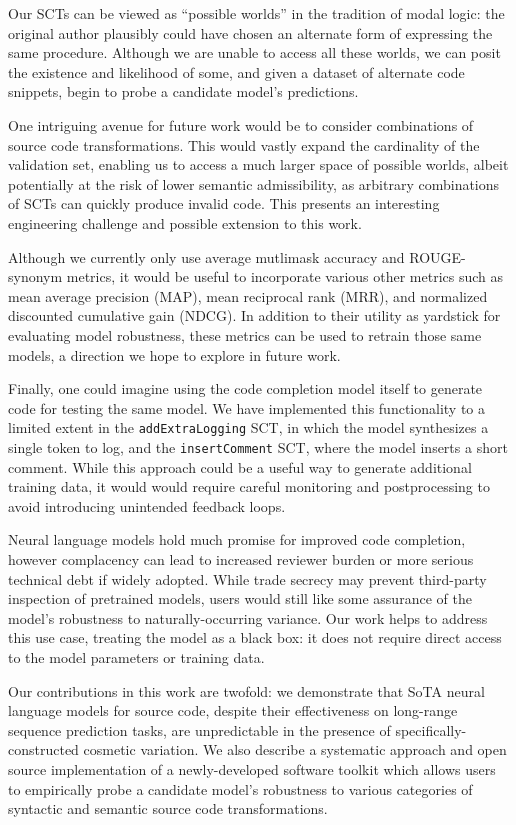 \documentclass[usenames,dvipsnames]{article} %
\begin{document}
  Our SCTs can be viewed as ``possible worlds'' in the tradition of modal logic: the original author plausibly could have chosen an alternate form of expressing the same procedure. Although we are unable to access all these worlds, we can posit the existence and likelihood of some, and given a dataset of alternate code snippets, begin to probe a candidate model's predictions.

  One intriguing avenue for future work would be to consider combinations of source code transformations. This would vastly expand the cardinality of the validation set, enabling us to access a much larger space of possible worlds, albeit potentially at the risk of lower semantic admissibility, as arbitrary combinations of SCTs can quickly produce invalid code. This presents an interesting engineering challenge and possible extension to this work.

  Although we currently only use average mutlimask accuracy and ROUGE-synonym metrics, it would be useful to incorporate various other metrics such as mean average precision (MAP), mean reciprocal rank (MRR), and normalized discounted cumulative gain (NDCG). In addition to their utility as yardstick for evaluating model robustness, these metrics can be used to retrain those same models, a direction we hope to explore in future work.

  Finally, one could imagine using the code completion model itself to generate code for testing the same model. We have implemented this functionality to a limited extent in the \lstinline|addExtraLogging| SCT, in which the model synthesizes a single token to log, and the \lstinline|insertComment| SCT, where the model inserts a short comment. While this approach could be a useful way to generate additional training data, it would would require careful monitoring and postprocessing to avoid introducing unintended feedback loops.

  Neural language models hold much promise for improved code completion, however complacency can lead to increased reviewer burden or more serious technical debt if widely adopted. While trade secrecy may prevent third-party inspection of pretrained models, users would still like some assurance of the model's robustness to naturally-occurring variance. Our work helps to address this use case, treating the model as a black box: it does not require direct access to the model parameters or training data.

  Our contributions in this work are twofold: we demonstrate that SoTA neural language models for source code, despite their effectiveness on long-range sequence prediction tasks, are unpredictable in the presence of specifically-constructed cosmetic variation. We also describe a systematic approach and open source implementation of a newly-developed software toolkit which allows users to empirically probe a candidate model's robustness to various categories of syntactic and semantic source code transformations.
  \pagebreak
  
  \appendix
\end{document}

